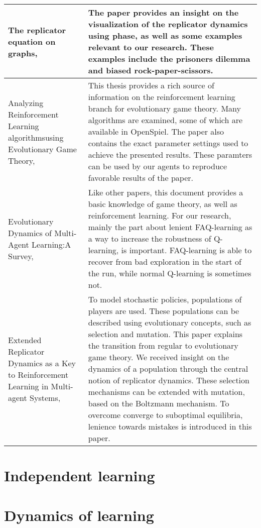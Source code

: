 \documentclass[10pt,a4paper]{article}
\begin{document}
\begin{tabular}{|p{4cm}|p{9cm}|}
\hline 
The replicator equation on graphs, \citet{Ohtsuki2006TheRE} & The paper provides an insight on the visualization of the replicator dynamics using phase, as well as some examples relevant to our research. These examples include the prisoners dilemma and biased rock-paper-scissors.\\
\hline
Analyzing Reinforcement Learning algorithmsusing Evolutionary Game Theory, \citet{bloembergenmaster} & This thesis provides a rich source of information on the reinforcement learning branch for evolutionary game theory. Many algorithms are examined, some of which are available in OpenSpiel. The paper also contains the exact parameter settings used to achieve the presented results. These paramters can be used by our agents to reproduce favorable results of the paper. \\
\hline
Evolutionary Dynamics of Multi-Agent Learning:A Survey, \citet{evoldynamics} & Like other papers, this document provides a basic knowledge of game theory, as well as reinforcement learning. For our research, mainly the part about lenient FAQ-learning as a way to increase the robustness of Q-learning, is important. FAQ-learning is able to recover from bad exploration in the start of the run, while normal Q-learning is sometimes not. \\
\hline
Extended Replicator Dynamics as a Key to Reinforcement Learning in Multi-agent Systems, \citet{extrepl} & To model stochastic policies, populations of players are used. These populations can be described using evolutionary concepts, such as selection and mutation. This paper explains the transition from regular to evolutionary game theory. We received insight on the dynamics of a population through the central notion of replicator dynamics. These selection mechanisms can be extended with mutation, based on the Boltzmann mechanism. To overcome converge to suboptimal equilibria, lenience towards mistakes is introduced in this paper.
\\ \hline
\end{tabular} 

\section{Independent learning}
\section{Dynamics of learning}


{}

\end{document}
